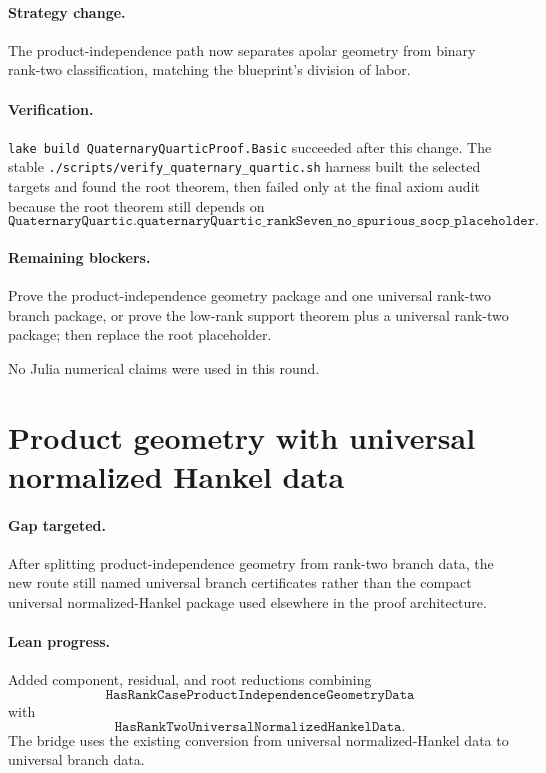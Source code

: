 \documentclass[11pt]{article}
\begin{document}
\paragraph{Strategy change.}
The product-independence path now separates apolar geometry from binary
rank-two classification, matching the blueprint's division of labor.

\paragraph{Verification.}
\texttt{lake build QuaternaryQuarticProof.Basic} succeeded after this change.
The stable \texttt{./scripts/verify\_quaternary\_quartic.sh} harness built the
selected targets and found the root theorem, then failed only at the final axiom
audit because the root theorem still depends on
\[
\texttt{QuaternaryQuartic.quaternaryQuartic\_rankSeven\_no\_spurious\_socp\_placeholder}.
\]

\paragraph{Remaining blockers.}
Prove the product-independence geometry package and one universal rank-two
branch package, or prove the low-rank support theorem plus a universal rank-two
package; then replace the root placeholder.

No Julia numerical claims were used in this round.

\section*{Product geometry with universal normalized Hankel data}

\paragraph{Gap targeted.}
After splitting product-independence geometry from rank-two branch data, the new
route still named universal branch certificates rather than the compact
universal normalized-Hankel package used elsewhere in the proof architecture.

\paragraph{Lean progress.}
Added component, residual, and root reductions combining
\[
\texttt{HasRankCaseProductIndependenceGeometryData}
\]
with
\[
\texttt{HasRankTwoUniversalNormalizedHankelData}.
\]
The bridge uses the existing conversion from universal normalized-Hankel data
to universal branch data.
\end{document}
